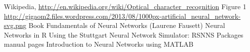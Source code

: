 \documentclass[a4paper,12pt]{report}
\begin{document}
\begin{thebibliography}{9}

  Wikipedia, \url{http://en.wikipedia.org/wiki/Optical_character_recognition}
  Figure 1 \url{http://gigaom2.files.wordpress.com/2013/08/1000px-artificial_neural_network-svg.png}
   Book {Fundamentals of Neural Networks (Laurene Fausett)}
   {Neural Networks in R Using the Stuttgart Neural Network Simulator: RSNNS}
   {Packages manual pages}
   {Introduction to Neural Networks using MATLAB}
  

\end{thebibliography}
\end{document}

